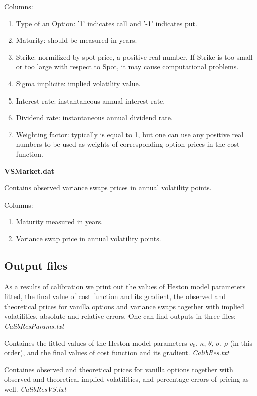 \documentclass[12pt,amsfonts,enumerate,amscd]{amsart}
\numberwithin{table}{section}
\numberwithin{equation}{section}
\begin{document}
Columns:
\begin{enumerate}[1]
\item Type of an Option: '1' indicates call and '-1' indicates put.
\item Maturity: should be measured in years.
\item Strike: normilized by spot price, a positive real number. If Strike is too small or too large with respect to Spot, it may cause computational problems.
\item Sigma implicite: implied volatility value.
\item Interest rate: instantaneous annual interest rate. 
\item Dividend rate: instantaneous annual dividend rate.
\item Weighting factor: typically is equal to 1, but one can use any positive real numbers to be used as weights of corresponding option prices in the cost function.
\end{enumerate}

\vskip0.5cm
\textbf{VSMarket.dat}

Contains observed variance swaps prices in annual volatility points.
 
Columns:
\begin{enumerate}[1]
\item Maturity measured in years.
\item Variance swap price in annual volatility points.
 \end{enumerate}

\vskip0.5cm
\subsection{Output files}
As a results of calibration we print out the values of Heston model parameters fitted, the final value of cost function and its gradient, the observed and theoretical prices for vanilla options and variance swaps together with implied volatilities, absolute and relative errors. One can find outputs in three files:
 \vskip0.5cm
\textit{CalibResParams.txt}

Containes the fitted values of the Heston model parameters $v_0$, $\kappa$, $\theta$, $\sigma$, $\rho$ (in this order), and the final values of cost function and its gradient.
 \vskip0.5cm
\textit{CalibRes.txt}

Containes observed and theoretical prices for vanilla options together with observed and theoretical implied volatilities, and percentage errors of pricing as well.
\vskip0.5cm
\textit{CalibResVS.txt}
\end{document}
